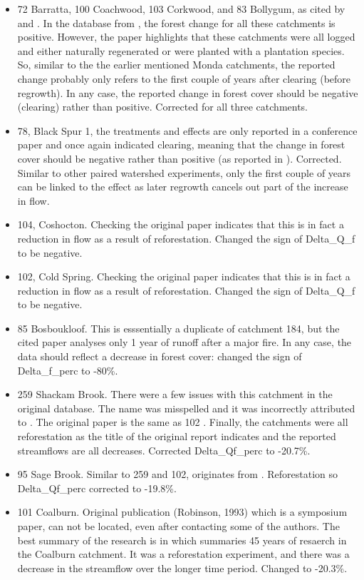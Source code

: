 \documentclass[]{elsarticle} %
\begin{document}
\begin{itemize}
\item
  72 Barratta, 100 Coachwood, 103 Corkwood, and 83 Bollygum, as cited by \citet{cornish1993} and \citet{cornish2001}. In the database from \citet{zhang2017}, the forest change for all these catchments is positive. However, the paper highlights that these catchments were all logged and either naturally regenerated or were planted with a plantation species. So, similar to the the earlier mentioned Monda catchments, the reported change probably only refers to the first couple of years after clearing (before regrowth). In any case, the reported change in forest cover should be negative (clearing) rather than positive. Corrected for all three catchments.
\item
  78, Black Spur 1, the treatments and effects are only reported in a conference paper \citep{jayasuriya1988} and once again indicated clearing, meaning that the change in forest cover should be negative rather than positive (as reported in \citet{zhang2017}). Corrected. Similar to other paired watershed experiments, only the first couple of years can be linked to the effect as later regrowth cancels out part of the increase in flow.
\item
  104, Coshocton. Checking the original paper indicates that this is in fact a reduction in flow as a result of reforestation. Changed the sign of Delta\_Q\_f to be negative.
\item
  102, Cold Spring. Checking the original paper \citep{schneider1961} indicates that this is in fact a reduction in flow as a result of reforestation. Changed the sign of Delta\_Q\_f to be negative.
\item
  85 Bosboukloof. This is esssentially a duplicate of catchment 184, but the cited paper analyses only 1 year of runoff after a major fire. In any case, the data should reflect a decrease in forest cover: changed the sign of Delta\_f\_perc to -80\%.
\item
  259 Shackam Brook. There were a few issues with this catchment in the original database. The name was misspelled and it was incorrectly attributed to \citet{brown2005}. The original paper is the same as 102 \citep{schneider1961}. Finally, the catchments were all reforestation as the title of the original report indicates and the reported streamflows are all decreases. Corrected Delta\_Qf\_perc to -20.7\%.
\item
  95 Sage Brook. Similar to 259 and 102, originates from \citet{schneider1961}. Reforestation so Delta\_Qf\_perc corrected to -19.8\%.
\item
  101 Coalburn. Original publication (Robinson, 1993) which is a symposium paper, can not be located, even after contacting some of the authors. The best summary of the research is in \citet{birkinshaw2014} which summaries 45 years of resaerch in the Coalburn catchment. It was a reforestation experiment, and there was a decrease in the streamflow over the longer time period. Changed to -20.3\%.
\end{itemize}
\end{document}
